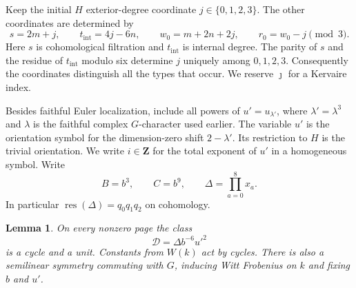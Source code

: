 \documentclass[11pt]{article}
\newtheorem{lemma}[theorem]{Lemma}
\theoremstyle{definition}
\theoremstyle{remark}
\numberwithin{equation}{section}
\begin{document}
Keep the initial $H$ exterior-degree coordinate $j\in\{0,1,2,3\}$.
The other coordinates are determined by
\begin{equation}\label{g:coordinates}
 s=2m+j,\qquad t_{\mathrm{int}}=4j-6n,\qquad
 w_0=m+2n+2j,\qquad r_0=w_0-j\pmod3.
\end{equation}
Here $s$ is cohomological filtration and $t_{\mathrm{int}}$ is internal
degree.  The parity of $s$ and the residue of $t_{\mathrm{int}}$ modulo
six determine $j$ uniquely among $0,1,2,3$.  Consequently the
coordinates distinguish all the types that occur.  We reserve
$\jmath$ for a Kervaire index.

Besides faithful Euler localization, include all powers of
$u'=u_{\lambda'}$, where $\lambda'=\lambda^3$ and $\lambda$ is the
faithful complex $G$-character used earlier.  The variable $u'$ is the
orientation symbol for the dimension-zero shift $2-\lambda'$.
Its restriction to $H$ is the trivial orientation.  We write $i\in\mathbf Z$ for
the total exponent of $u'$ in a homogeneous symbol.  Write
\[
 B=b^3,\qquad C=b^9,\qquad
 \Delta=\prod_{a=0}^8x_a.
\]
In particular $\operatorname{res}(\Delta)=q_0q_1q_2$ on cohomology.

\begin{lemma}\label{g:translations}
On every nonzero page the class
\begin{equation}\label{g:Delta-unit}
 \mathcal D=\Delta b^{-6}u'^2
\end{equation}
is a cycle and a unit.  Constants from $W(k)$ act by cycles.  There is
also a semilinear symmetry commuting with $G$, inducing Witt
Frobenius on $k$ and fixing $b$ and $u'$.
\end{lemma}
\end{document}
